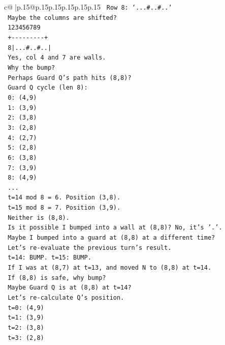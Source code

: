\documentclass{article}
\begin{document}
{\begin{supertabular}{c@{$\;$}|p{.15\linewidth}@{}p{.15\linewidth}p{.15\linewidth}p{.15\linewidth}p{.15\linewidth}p{.15\linewidth}}
{{{\texttt{   Row 8: `...\#..\#..`} \\
\texttt{   Maybe the columns are shifted?} \\
\texttt{   123456789} \\
\texttt{   +{-}{-}{-}{-}{-}{-}{-}{-}{-}+} \\
\texttt{   8|...\#..\#..|} \\
\texttt{   Yes, col 4 and 7 are walls.} \\
\texttt{   Why the bump?} \\
\texttt{   Perhaps Guard Q's path hits (8,8)?} \\
\texttt{   Guard Q cycle (len 8):} \\
\texttt{   0: (4,9)} \\
\texttt{   1: (3,9)} \\
\texttt{   2: (3,8)} \\
\texttt{   3: (2,8)} \\
\texttt{   4: (2,7)} \\
\texttt{   5: (2,8)} \\
\texttt{   6: (3,8)} \\
\texttt{   7: (3,9)} \\
\texttt{   8: (4,9)} \\
\texttt{   ...} \\
\texttt{   t=14 mod 8 = 6. Position (3,8).} \\
\texttt{   t=15 mod 8 = 7. Position (3,9).} \\
\texttt{   Neither is (8,8).} \\
\texttt{   Is it possible I bumped into a wall at (8,8)? No, it's '.'.} \\
\texttt{   Maybe I bumped into a guard at (8,8) at a different time?} \\
\texttt{   Let's re{-}evaluate the previous turn's result.} \\
\texttt{   t=14: BUMP. t=15: BUMP.} \\
\texttt{   If I was at (8,7) at t=13, and moved N to (8,8) at t=14.} \\
\texttt{   If (8,8) is safe, why bump?} \\
\texttt{   Maybe Guard Q is at (8,8) at t=14?} \\
\texttt{   Let's re{-}calculate Q's position.} \\
\texttt{   t=0: (4,9)} \\
\texttt{   t=1: (3,9)} \\
\texttt{   t=2: (3,8)} \\
\texttt{   t=3: (2,8)} \\
}}}
\end{supertabular}}
\end{document}
